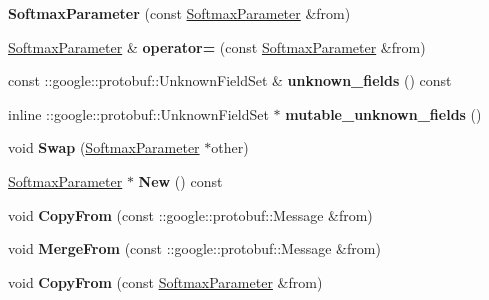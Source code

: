 \begin{DoxyCompactItemize}
{\bfseries Softmax\+Parameter} (const \mbox{\hyperlink{classcaffe_1_1_softmax_parameter}{Softmax\+Parameter}} \&from)
\item 
\mbox{\label{classcaffe_1_1_softmax_parameter_a53e5b0f0b40b9e28eddc1ac8f6b596c3}} 
\mbox{\hyperlink{classcaffe_1_1_softmax_parameter}{Softmax\+Parameter}} \& {\bfseries operator=} (const \mbox{\hyperlink{classcaffe_1_1_softmax_parameter}{Softmax\+Parameter}} \&from)
\item 
\mbox{\label{classcaffe_1_1_softmax_parameter_acc4675acf274eba1343472e4b9523e65}} 
const \+::google\+::protobuf\+::\+Unknown\+Field\+Set \& {\bfseries unknown\+\_\+fields} () const
\item 
\mbox{\label{classcaffe_1_1_softmax_parameter_a5112e506c6d1a70973c9f93ff6b78d3d}} 
inline \+::google\+::protobuf\+::\+Unknown\+Field\+Set $\ast$ {\bfseries mutable\+\_\+unknown\+\_\+fields} ()
\item 
\mbox{\label{classcaffe_1_1_softmax_parameter_a261ca2d11c9e1c6a068d983109cd7000}} 
void {\bfseries Swap} (\mbox{\hyperlink{classcaffe_1_1_softmax_parameter}{Softmax\+Parameter}} $\ast$other)
\item 
\mbox{\label{classcaffe_1_1_softmax_parameter_a402efb7889707faf29125f5e9c885c7e}} 
\mbox{\hyperlink{classcaffe_1_1_softmax_parameter}{Softmax\+Parameter}} $\ast$ {\bfseries New} () const
\item 
\mbox{\label{classcaffe_1_1_softmax_parameter_a47c2fc9c41c3cad954980f61cc42e2a1}} 
void {\bfseries Copy\+From} (const \+::google\+::protobuf\+::\+Message \&from)
\item 
\mbox{\label{classcaffe_1_1_softmax_parameter_a545a48644e6bd2dfef7d6bc125f90a08}} 
void {\bfseries Merge\+From} (const \+::google\+::protobuf\+::\+Message \&from)
\item 
\mbox{\label{classcaffe_1_1_softmax_parameter_a1e000a7ac0032fb2145947af5279d055}} 
void {\bfseries Copy\+From} (const \mbox{\hyperlink{classcaffe_1_1_softmax_parameter}{Softmax\+Parameter}} \&from)

\end{DoxyCompactItemize}

